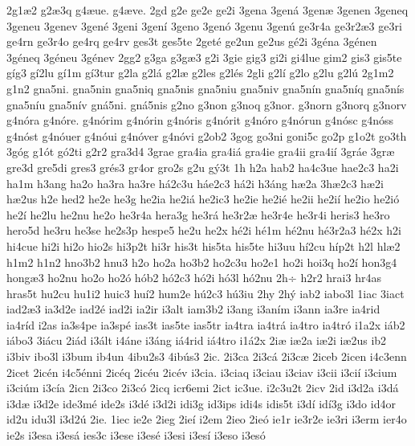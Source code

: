 {2g1^^e62
g2^^e63q
g4^^e6ue.
g4^^e6ve.
2gd
g2e
ge2e
ge2i
3gena
3gen^^e1
3gen^^e6
3genen
3geneq
3geneu
3genev
3gen^^e9
3geni
3gen^^ed
3geno
3gen^^f3
3genu
3gen^^fa
ge3r4a
ge3r2^^e63
ge3ri
ge4rn
ge3r4o
ge4rq
ge4rv
ges3t
ges5te
2get^^e9
ge2un
ge2us
g^^e92i
3g^^e9na
3g^^e9nen
3g^^e9neq
3g^^e9neu
3g^^e9nev
2gg2
g3ga
g3g^^e63
g2i
3gie
gig3
gi2i
gi4lue
gim2
gis3
gis5te
g^^edg3
g^^ed2lu
g^^ed1m
g^^ed3tur
g2la
g2l^^e1
g2l^^e6
g2les
g2l^^e9s
2gli
g2l^^ed
g2lo
g2lu
g2l^^fa
2g1m2
g1n2
gna5ni.
gna5nin
gna5niq
gna5nis
gna5niu
gna5niv
gna5n^^edn
gna5n^^edq
gna5n^^eds
gna5n^^edu
gna5n^^edv
gn^^e15ni.
gn^^e15nis
g2no
g3non
g3noq
g3nor.
g3norn
g3norq
g3norv
g4n^^f3ra
g4n^^f3re.
g4n^^f3rim
g4n^^f3rin
g4n^^f3ris
g4n^^f3rit
g4n^^f3ro
g4n^^f3run
g4n^^f3sc
g4n^^f3ss
g4n^^f3st
g4n^^f3uer
g4n^^f3ui
g4n^^f3ver
g4n^^f3vi
g2ob2
3gog
go3ni
goni5c
go2p
g1o2t
go3th
3g^^f3g
g1^^f3t
g^^f32ti
g2r2
gra3d4
3grae
gra4ia
gra4i^^e1
gra4ie
gra4ii
gra4i^^ed
3gr^^e1e
3gr^^e6
gre3d
gre5di
gres3
gr^^e9s3
gr4or
gro2s
g2u
g^^fd3t
1h
h2a
hab2
ha4c3ue
hae2c3
ha2i
ha1m
h3ang
ha2o
ha3ra
ha3re
h^^e12c3u
h^^e1e2c3
h^^e12i
h3^^e1ng
h^^e62a
3h^^e62c3
h^^e62i
h^^e62us
h2e
hed2
he2e
he3g
he2ia
he2i^^e1
he2ic3
he2ie
he2i^^e9
he2ii
he2i^^ed
he2io
he2i^^f3
he2^^ed
he2lu
he2nu
he2o
he3r4a
hera3g
he3r^^e1
he3r2^^e6
he3r4e
he3r4i
heris3
he3ro
hero5d
he3ru
he3se
he2s3p
hespe5
he2u
he2x
h^^e92i
h^^e91m
h^^e92nu
h^^e93r2a3
h^^e92x
h2i
hi4cue
hi2i
hi2o
hio2s
hi3p2t
hi3r
his3t
his5ta
his5te
hi3uu
h^^ed2cu
h^^edp2t
h2l
hl^^e62
h1m2
h1n2
hno3b2
hnu3
h2o
ho2a
ho3b2
ho2c3u
ho2e1
ho2i
hoi3q
ho2^^ed
hon3g4
hong^^e63
ho2nu
ho2o
ho2^^f3
h^^f3b2
h^^f32c3
h^^f32i
h^^f33l
h^^f32nu
2h^^f7
h2r2
hrai3
hr4as
hras5t
hu2cu
hu1i2
huic3
hu^^ed2
hum2e
h^^fa2c3
h^^fa3iu
2hy
2h^^fd
iab2
iabo3l
1iac
3iact
iad2^^e63
ia3d2e
iad2^^e9
iad2i
ia2ir
i3alt
iam3b2
i3ang
i3an^^edm
i3ann
ia3re
ia4rid
ia4r^^edd
i2as
ia3s4pe
ia3sp^^e9
ias3t
ias5te
ias5tr
ia4tra
ia4tr^^e1
ia4tro
ia4tr^^f3
i1a2x
i^^e1b2
i^^e1bo3
3i^^e1cu
2i^^e1d
i3^^e1lt
i4^^e1ne
i3^^e1ng
i^^e14rid
i^^e14tro
i1^^e12x
2i^^e6
i^^e62a
i^^e62i
i^^e62us
ib2
i3biv
ibo3l
i3bum
ib4un
4ibu2s3
4ib^^fas3
2ic.
2i3ca
2i3c^^e1
2i3c^^e6
2iceb
2icen
i4c3enn
2icet
2ic^^e9n
i4c5^^e9nni
2ic^^e9q
2ic^^e9u
2ic^^e9v
i3cia.
i3ciaq
i3ciau
i3ciav
i3cii
i3ci^^ed
i3cium
i3ci^^fam
i3c^^eda
2icn
2i3co
2i3c^^f3
2icq
icr6emi
2ict
ic3ue.
i2c3u2t
2icv
2id
i3d2a
i3d^^e1
i3d^^e6
i3d2e
ide3m^^e9
ide2s
i3d^^e9
i3d2i
idi3g
id3ips
idi4s
idis5t
i3d^^ed
id^^ed3g
i3do
id4or
id2u
idu3l
i3d2^^fa
2ie.
1iec
ie2e
2ieg
2ie^^ed
i2em
2ieo
2ie^^f3
ie1r
ie3r2e
ie3ri
i3erm
ier4o
ie2s
i3esa
i3es^^e1
ies3c
i3ese
i3es^^e9
i3esi
i3es^^ed
i3eso
i3es^^f3
}

